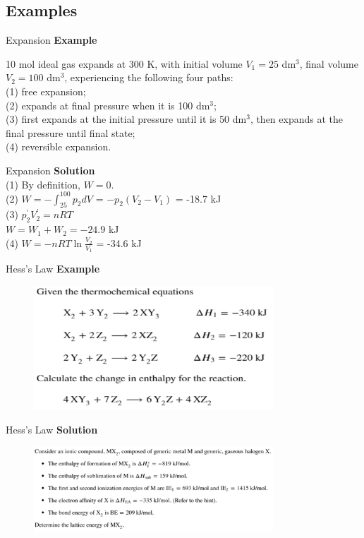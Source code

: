 \documentclass[12pt,compress]{beamer}
\begin{document}
\subsection{Examples}
\begin{frame}{Expansion}
	\textbf{Example}
	\par 10 mol ideal gas expands at 300 K, with initial volume $V_1 = 25$ dm$^3$, final volume $V_2 = 100$ dm$^3$,
	experiencing the following four paths: \\ 
	(1) free expansion; \\ 
	(2) expands at final pressure when it is 100 dm$^3$; \\ 
	(3) first expands at the initial pressure until it is 50 dm$^3$, then expands at the final pressure until final state; \\ 
	(4) reversible expansion.
\end{frame}
\begin{frame}{Expansion}
	\textbf{Solution} \\ 
	(1) By definition, $W = 0$. \\ 
	(2) $W = -\int_{25}^{100} p_{2} dV$ = $-p_2(V_2-V_1)$ = -18.7 kJ \\ 
	(3) $p^\prime_2V^\prime_2 = nRT$ \\ 
		\qquad $W = W_1 + W_2 = -24.9$ kJ \\ 
	(4) $W = -nRT\ln\frac{V_2}{V_1}$ = -34.6 kJ
\end{frame}
\begin{frame}{Hess's Law}
	\textbf{Example}
	\begin{figure}
		\centering
		\includegraphics[width=0.8\textwidth]{hess's_law.png}
	\end{figure}
\end{frame}
\begin{frame}{Hess's Law}
	\textbf{Solution}
	\begin{figure}
		\centering
		\includegraphics[width=0.8\textwidth]{hess's_law_ans.png}
	\end{figure}
\end{frame}
\end{document}
